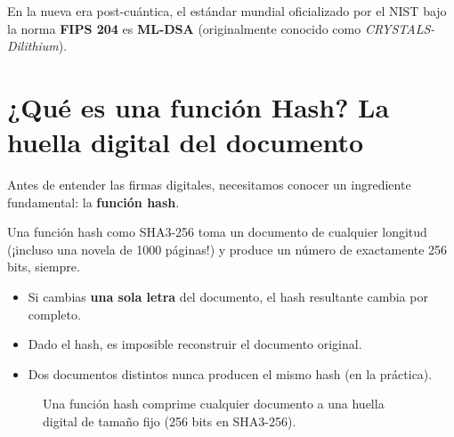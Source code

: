En la nueva era post-cuántica, el estándar mundial oficializado por el NIST bajo la norma \textbf{FIPS 204} es \textbf{ML-DSA} (originalmente conocido como \textit{CRYSTALS-Dilithium}).

\section{¿Qué es una función Hash? La huella digital del documento}

Antes de entender las firmas digitales, necesitamos conocer un ingrediente fundamental: la \textbf{función hash}.

\begin{intuicion}
Una función hash como SHA3-256 toma un documento de cualquier longitud (¡incluso una novela de 1000 páginas!) y produce un número de exactamente 256 bits, siempre.
\begin{itemize}
  \item Si cambias \textbf{una sola letra} del documento, el hash resultante cambia por completo.
  \item Dado el hash, es imposible reconstruir el documento original.
  \item Dos documentos distintos nunca producen el mismo hash (en la práctica).
\end{itemize}
\end{intuicion}

\begin{figure}[htbp]
\centering
{}
\caption{Una función hash comprime cualquier documento a una huella digital de tamaño fijo (256 bits en SHA3-256).}
\label{fig:hash}
\end{figure}

